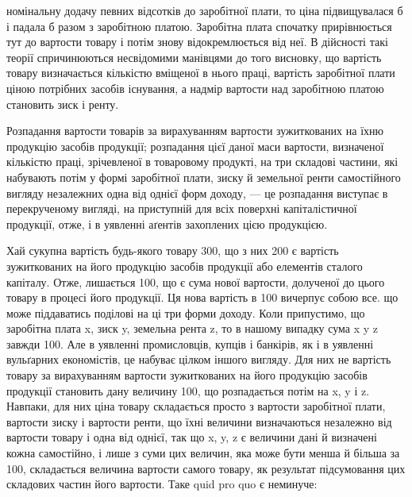 \parcont{}  %
номінальну додачу певних відсотків до заробітної плати, то ціна підвищувалася
б і падала б разом з заробітною платою. Заробітна плата спочатку прирівнюється
тут до вартости товару і потім знову відокремлюється від неї.
В дійсності такі теорії спричинюються несвідомими манівцями до того висновку,
що вартість товару визначається кількістю вміщеної в нього праці, вартість заробітної
плати ціною потрібних засобів існування, а надмір вартости над заробітною
платою становить зиск і ренту.

Розпадання вартости товарів за вирахуванням вартости зужиткованих на
їхню продукцію засобів продукції; розпадання цієї даної маси вартости, визначеної
кількістю праці, зрічевленої в товаровому продукті, на три складові частини,
які набувають потім у формі заробітної плати, зиску й земельної ренти
самостійного вигляду незалежних одна від однієї форм доходу, — це розпадання
виступає в перекрученому вигляді, на приступній для всіх поверхні капіталістичної
продукції, отже, і в уявленні аґентів захоплених цією продукцією.

Хай сукупна вартість будь-якого товару \deq{} 300, що з них 200 є вартість
зужиткованих на його продукцію засобів продукції або елементів сталого
капіталу. Отже, лишається 100, що є сума нової вартости, долученої до цього
товару в процесі його продукції. Ця нова вартість в 100 вичерпує собою все.
що може піддаватись поділові на ці три форми доходу. Коли припустимо, що
заробітна плата \deq{} x, зиск \deq{} y, земельна рента \deq{} z, то в нашому випадку
сума x \dplus{} y \dplus{} z завжди \deq{} 100. Але в уявленні промисловців, купців і банкірів,
як і в уявленні вульґарних економістів, це набуває цілком іншого вигляду. Для
них не вартість товару за вирахуванням вартости зужиткованих на його продукцію
засобів продукції становить дану величину \deq{} 100, що розпадається потім
на x, y і z. Навпаки, для них ціна товару складається просто з вартости заробітної
плати, вартости зиску і вартости ренти, що їхні величини визначаються
незалежно від вартости товару і одна від однієї, так що x, y, z є величини
дані й визначені кожна самостійно, і лише з суми цих величин, яка може бути
менша й більша за 100, складається величина вартости самого товару, як результат
підсумовання цих складових частин його вартости. Таке quid pro quo
є неминуче:

